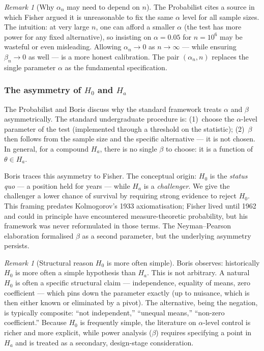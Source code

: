 \documentclass[a4paper,oneside,12pt]{extarticle}
\theoremstyle{plain}
\theoremstyle{definition}
\theoremstyle{remark}
\newtheorem{remark}[proposition]{Remark}
\begin{document}
\begin{remark}[Why $\alpha_n$ may need to depend on $n$]
The Probabilist cites a source in which Fisher argued it is unreasonable to fix
the same $\alpha$ level for all sample sizes.  The intuition: at very
large $n$, one can afford a smaller $\alpha$ (the test has more power
for any fixed alternative), so insisting on $\alpha = 0.05$ for
$n = 10^6$ may be wasteful or even misleading.  Allowing $\alpha_n
\to 0$ as $n \to \infty$ — while ensuring $\beta_n \to 0$ as well —
is a more honest calibration.  The pair $(\alpha_n, n)$ replaces the
single parameter $\alpha$ as the fundamental specification.
\end{remark}

\subsubsection*{The asymmetry of $H_0$ and $H_a$}

The Probabilist and Boris discuss why the standard framework treats $\alpha$ and
$\beta$ asymmetrically.  The standard undergraduate procedure is:
(1)~choose the $\alpha$-level parameter of the test (implemented
through a threshold on the statistic); (2)~$\beta$ then follows from
the sample size and the specific alternative — it is not chosen.  In
general, for a compound $H_a$, there is no single $\beta$ to choose:
it is a function of $\theta \in H_a$.

Boris traces this asymmetry to Fisher.  The conceptual origin: $H_0$
is the \emph{status quo} — a position held for years — while $H_a$ is
a \emph{challenger}.  We give the challenger a lower chance of
survival by requiring strong evidence to reject $H_0$.  This
framing predates Kolmogorov's 1933 axiomatisation; Fisher lived until
1962 and could in principle have encountered measure-theoretic
probability, but his framework was never reformulated in those terms.
The Neyman--Pearson elaboration formalised $\beta$ as a second
parameter, but the underlying asymmetry persists.

\begin{remark}[Structural reason $H_0$ is more often simple]
Boris observes: historically $H_0$ is more often a simple
hypothesis than $H_a$.  This is not arbitrary.  A natural $H_0$
is often a specific structural claim — independence, equality of
means, zero coefficient — which pins down the parameter exactly
(up to nuisance, which is then either known or eliminated by a pivot).
The alternative, being the negation, is typically composite: ``not
independent,'' ``unequal means,'' ``non-zero coefficient.''
Because $H_0$ is frequently simple, the literature on $\alpha$-level
control is richer and more explicit, while power analysis ($\beta$)
requires specifying a point in $H_a$ and is treated as a secondary,
design-stage consideration.
\end{remark}
\end{document}
